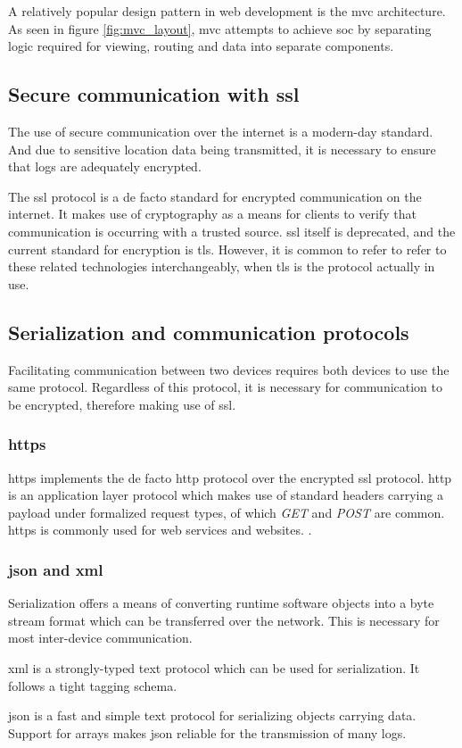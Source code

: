 A relatively popular design pattern in web development is the \ac{mvc} architecture.
As seen in figure \ref{fig:mvc_layout}, \ac{mvc} attempts to achieve \ac{soc} by separating logic required for viewing, routing and data into separate components.

\subsection{Secure communication with \ac{ssl}}
The use of secure communication over the internet is a modern-day standard.
And due to sensitive location data being transmitted, it is necessary to ensure that logs are adequately encrypted.

The \ac{ssl} protocol is a de facto standard for encrypted communication on the internet.
It makes use of cryptography as a means for clients to verify that communication is occurring with a trusted source.
\Ac{ssl} itself is deprecated, and the current standard for encryption is \ac{tls}.
However, it is common to refer to refer to these related technologies interchangeably, when \ac{tls} is the protocol actually in use. \cite{hickman1995ssl}

\subsection{Serialization and communication protocols}
Facilitating communication between two devices requires both devices to use the same protocol.
Regardless of this protocol, it is necessary for communication to be encrypted, therefore making use of \ac{ssl}.

\subsubsection{\Ac{https}}
\Ac{https} implements the de facto \Ac{http} protocol over the encrypted \ac{ssl} protocol.
\Ac{http} is an application layer protocol which makes use of standard headers carrying a payload under formalized request types, of which \textit{GET} and \textit{POST} are common.
\Ac{https} is commonly used for web services and websites.
\cite{fielding1999hypertext}.

\subsubsection{\Ac{json} and \Ac{xml}}
Serialization offers a means of converting runtime software objects into a byte stream format which can be transferred over the network. This is necessary for most inter-device communication.

\Ac{xml} is a strongly-typed text protocol which can be used for serialization.
It follows a tight tagging schema.

\Ac{json} is a fast and simple text protocol for serializing objects carrying data.
Support for arrays makes \ac{json} reliable for the transmission of many logs.
\cite{nurseitov2009comparison}

\pagebreak

